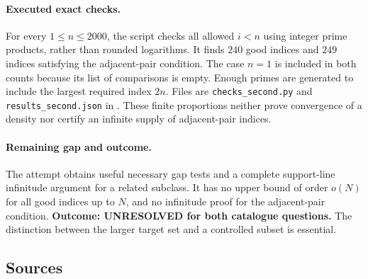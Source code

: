 \documentclass[11pt,a4paper]{article}
\begin{document}
\paragraph{Executed exact checks.}
For every $1\le n\le2000$, the script checks all allowed $i<n$
using integer prime products, rather than rounded logarithms. It finds
$240$ good indices and $249$ indices satisfying the adjacent-pair
condition. The case $n=1$ is included in both counts because its list
of comparisons is empty. Enough primes are generated to include the
largest required index $2n$. Files are \texttt{checks\_second.py} and
\texttt{results\_second.json} in
.
These finite proportions neither prove convergence of a density nor
certify an infinite supply of adjacent-pair indices.

\paragraph{Remaining gap and outcome.}
The attempt obtains useful necessary gap tests and a complete support-line
infinitude argument for a related subclass. It has no upper bound of
order $o(N)$ for all good indices up to $N$, and no infinitude proof
for the adjacent-pair condition. \textbf{Outcome: UNRESOLVED for both
catalogue questions.} The distinction between the larger target set
and a controlled subset is essential.

\subsection{Sources}
\end{document}
